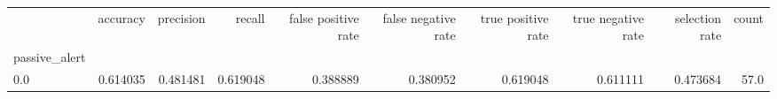 \begin{tabular}{lrrrrrrrrr}
\toprule
{} &  accuracy &  precision &    recall &  false positive rate &  false negative rate &  true positive rate &  true negative rate &  selection rate &  count \\
passive\_alert &           &            &           &                      &                      &                     &                     &                 &        \\
\midrule
0.0           &  0.614035 &   0.481481 &  0.619048 &             0.388889 &             0.380952 &            0.619048 &            0.611111 &        0.473684 &   57.0 \\
\bottomrule
\end{tabular}
